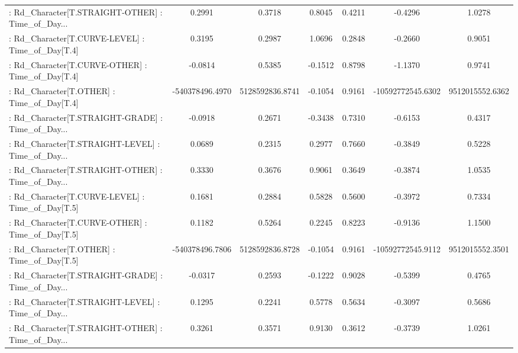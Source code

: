 \begin{longtable}{p{4cm}cccccc}
 : Rd\_Character[T.STRAIGHT-OTHER] : Time\_of\_Day... &            0.2991 &            0.3718 &  0.8045 &       0.4211 &            -0.4296 &            1.0278 \\
 : Rd\_Character[T.CURVE-LEVEL] : Time\_of\_Day[T.4]  &            0.3195 &            0.2987 &  1.0696 &       0.2848 &            -0.2660 &            0.9051 \\
 : Rd\_Character[T.CURVE-OTHER] : Time\_of\_Day[T.4]  &           -0.0814 &            0.5385 & -0.1512 &       0.8798 &            -1.1370 &            0.9741 \\
 : Rd\_Character[T.OTHER] : Time\_of\_Day[T.4]        &   -540378496.4970 &   5128592836.8741 & -0.1054 &       0.9161 &  -10592772545.6302 &   9512015552.6362 \\
 : Rd\_Character[T.STRAIGHT-GRADE] : Time\_of\_Day... &           -0.0918 &            0.2671 & -0.3438 &       0.7310 &            -0.6153 &            0.4317 \\
 : Rd\_Character[T.STRAIGHT-LEVEL] : Time\_of\_Day... &            0.0689 &            0.2315 &  0.2977 &       0.7660 &            -0.3849 &            0.5228 \\
 : Rd\_Character[T.STRAIGHT-OTHER] : Time\_of\_Day... &            0.3330 &            0.3676 &  0.9061 &       0.3649 &            -0.3874 &            1.0535 \\
 : Rd\_Character[T.CURVE-LEVEL] : Time\_of\_Day[T.5]  &            0.1681 &            0.2884 &  0.5828 &       0.5600 &            -0.3972 &            0.7334 \\
 : Rd\_Character[T.CURVE-OTHER] : Time\_of\_Day[T.5]  &            0.1182 &            0.5264 &  0.2245 &       0.8223 &            -0.9136 &            1.1500 \\
 : Rd\_Character[T.OTHER] : Time\_of\_Day[T.5]        &   -540378496.7806 &   5128592836.8728 & -0.1054 &       0.9161 &  -10592772545.9112 &   9512015552.3501 \\
 : Rd\_Character[T.STRAIGHT-GRADE] : Time\_of\_Day... &           -0.0317 &            0.2593 & -0.1222 &       0.9028 &            -0.5399 &            0.4765 \\
 : Rd\_Character[T.STRAIGHT-LEVEL] : Time\_of\_Day... &            0.1295 &            0.2241 &  0.5778 &       0.5634 &            -0.3097 &            0.5686 \\
 : Rd\_Character[T.STRAIGHT-OTHER] : Time\_of\_Day... &            0.3261 &            0.3571 &  0.9130 &       0.3612 &            -0.3739 &            1.0261 \\

\end{longtable}
